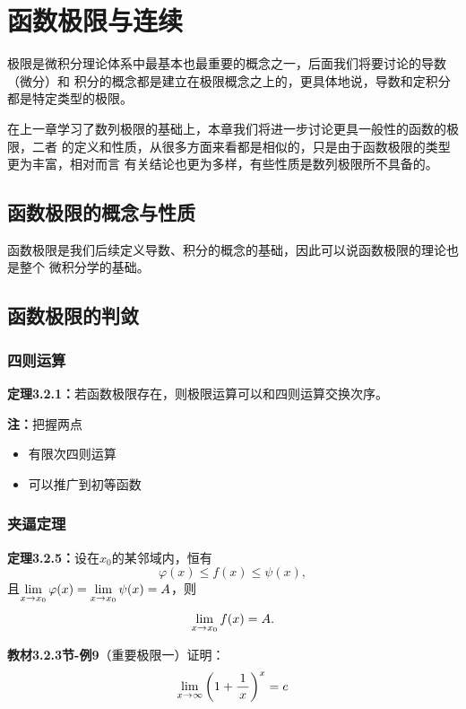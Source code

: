 \setcounter{chapter}{2}

\chapter{函数极限与连续}

极限是微积分理论体系中最基本也最重要的概念之一，后面我们将要讨论的导数（微分）和
积分的概念都是建立在极限概念之上的，更具体地说，导数和定积分都是特定类型的极限。

在上一章学习了数列极限的基础上，本章我们将进一步讨论更具一般性的函数的极限，二者
的定义和性质，从很多方面来看都是相似的，只是由于函数极限的类型更为丰富，相对而言
有关结论也更为多样，有些性质是数列极限所不具备的。

\section{函数极限的概念与性质}

函数极限是我们后续定义导数、积分的概念的基础，因此可以说函数极限的理论也是整个
微积分学的基础。



\section{函数极限的判敛}

\subsection{四则运算}

{\bf 定理3.2.1：}若函数极限存在，则极限运算可以和四则运算交换次序。

{\bf 注：}把握两点
\begin{itemize}
  \setlength{\itemindent}{1cm}
  \item 有限次四则运算
  \item 可以推广到初等函数
\end{itemize}







\subsection{夹逼定理}

{\bf 定理3.2.5：}设在$x_0$的某邻域内，恒有
$$\varphi(x)\leq f(x)\leq\psi(x), $$
且$\lim\limits_{x\to{x_0}}\varphi(x)=\lim\limits_{x\to{x_0}}\psi(x)=A$，则
$$\lim\limits_{x\to{x_0}}f(x)=A.$$

{\bf 教材3.2.3节-例9}（重要极限一）证明：
$$\lim\limits_{x\to{\infty}}\left(1+\displaystyle\frac{\,{1}\,}{\,{x}\,}\right)^x=e$$

